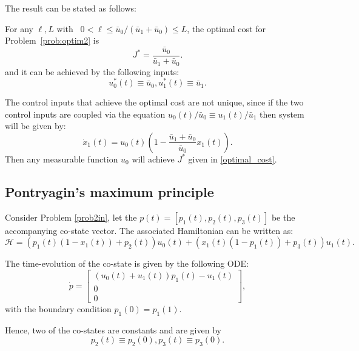 The result can be stated as follows:
\begin{theorem}\label{prob2in}
	For any $\ell,L$ with ~$0<\ell\le\bar u_0/(\bar u_1+\bar u_0)\le L$, the optimal cost for Problem~\ref{prob:optim2}  is
	\begin{equation}\label{optimal_cost}
		J^*= \frac{\bar u_0}{\bar u_1+ \bar u_0}.
	\end{equation}
	and it can be achieved by the following inputs:
	\begin{equation}\label{optimal_u2} 
		u_0^*(t) \equiv  \bar u_0,  u_1^*(t)\equiv \bar u_1.
	\end{equation}
\end{theorem}

\begin{remark}
	The control inputs that achieve  the optimal cost are not unique, since if the two control inputs are coupled via the equation $u_0(t)/\bar u_0 \equiv u_1(t)/\bar u_1$ then system will be given by:
	\[\dot x_1(t) =  u_0(t) \left (1 -  \frac{\bar u_1+\bar u_0}{\bar u_0}x_1(t)\right ).\]
	Then any measurable function $u_0$ will achieve $J^*$ given in \eqref{optimal_cost}.
\end{remark}

\subsection{Pontryagin's maximum principle}

Consider Problem \ref{prob2in}, let the $p(t)=[p_1(t),p_2(t),p_3(t)]$ be the accompanying co-state vector. 
The associated Hamiltonian can be written as:
\begin{equation}\label{hamil} 
	\mathcal H = (p_1(t) (1-x_1(t) ) +p_2(t)) u_0(t)+ ( x_1(t)(1-p_1(t)) + p_3(t) )  u_1(t).  
\end{equation}

The time-evolution of the co-state is given by the following ODE:
\begin{equation}
	\dot p = \begin{bmatrix} (u_0(t)+u_1(t)) p_1(t) - u_1 (t)\\ 0 \\ 0 \end{bmatrix},
\end{equation}
with the boundary condition $p_1(0)=p_1(1)$.

Hence, two of the co-states are constants and are given by 
\begin{equation}
	p_2(t)\equiv p_2(0), p_3(t)\equiv p_3(0).
\end{equation} 

